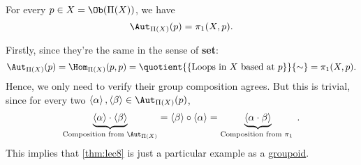 \begin{remark}
	For every \(p\in X=\Ob (\Pi (X))\), we have
	\[
		\Aut _{\Pi (X)}(p) = \pi _1(X, p).
	\]

	Firstly, since they're the same in the sense of \textbf{set}:
	\[
		\Aut_{\Pi (X)} (p) = \Hom _{\Pi (X)}(p, p) = \quotient{\left\{\text{Loops in \(X\) based at \(p\)} \right\}}{\sim} = \pi _1(X, p).
	\]
	Hence, we only need to verify their group composition agrees. But this is trivial, since for every two \(\left< \alpha  \right> , \left< \beta  \right> \in \Aut_{\Pi (X)}(p) \),
	\[
		\underbrace{\left< \alpha  \right> \cdot \left< \beta  \right> }_{\text{Composition from \(\Aut_{\Pi(X)}\)}} = \left< \beta  \right> \circ \left< \alpha  \right> =\underbrace{ \left< \alpha \cdot \beta\right>}_{\text{Composition from \(\pi_1\) } }.
	\]
	This implies that \autoref{thm:lec8} is just a particular example as a \hyperref[def:groupoid]{groupoid}.
\end{remark}